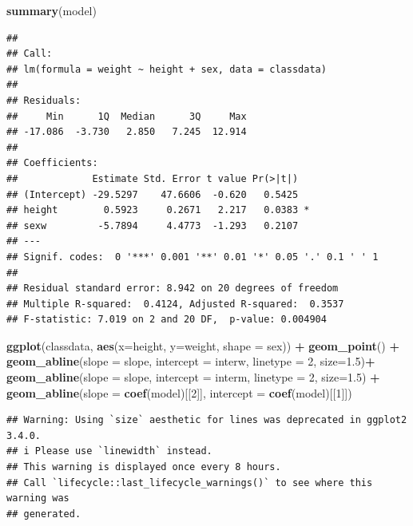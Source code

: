 \documentclass[
  doc]{apa6}
\newenvironment{Shaded}{\begin{snugshade}}{\end{snugshade}}
\newcommand{\AttributeTok}[1]{\textcolor[rgb]{0.13,0.29,0.53}{#1}}
\newcommand{\DecValTok}[1]{\textcolor[rgb]{0.00,0.00,0.81}{#1}}
\newcommand{\FloatTok}[1]{\textcolor[rgb]{0.00,0.00,0.81}{#1}}
\newcommand{\FunctionTok}[1]{\textcolor[rgb]{0.13,0.29,0.53}{\textbf{#1}}}
\newcommand{\NormalTok}[1]{#1}
\newcommand{\SpecialCharTok}[1]{\textcolor[rgb]{0.81,0.36,0.00}{\textbf{#1}}}
\begin{document}
\begin{Shaded}
\begin{Highlighting}[]
\FunctionTok{summary}\NormalTok{(model)}
\end{Highlighting}
\end{Shaded}

\begin{verbatim}
## 
## Call:
## lm(formula = weight ~ height + sex, data = classdata)
## 
## Residuals:
##     Min      1Q  Median      3Q     Max 
## -17.086  -3.730   2.850   7.245  12.914 
## 
## Coefficients:
##             Estimate Std. Error t value Pr(>|t|)  
## (Intercept) -29.5297    47.6606  -0.620   0.5425  
## height        0.5923     0.2671   2.217   0.0383 *
## sexw         -5.7894     4.4773  -1.293   0.2107  
## ---
## Signif. codes:  0 '***' 0.001 '**' 0.01 '*' 0.05 '.' 0.1 ' ' 1
## 
## Residual standard error: 8.942 on 20 degrees of freedom
## Multiple R-squared:  0.4124, Adjusted R-squared:  0.3537 
## F-statistic: 7.019 on 2 and 20 DF,  p-value: 0.004904
\end{verbatim}

\newpage

\begin{Shaded}
\begin{Highlighting}[]
\FunctionTok{ggplot}\NormalTok{(classdata, }\FunctionTok{aes}\NormalTok{(}\AttributeTok{x=}\NormalTok{height, }\AttributeTok{y=}\NormalTok{weight, }\AttributeTok{shape =}\NormalTok{ sex)) }\SpecialCharTok{+}
  \FunctionTok{geom\_point}\NormalTok{() }\SpecialCharTok{+}
  \FunctionTok{geom\_abline}\NormalTok{(}\AttributeTok{slope =}\NormalTok{ slope, }\AttributeTok{intercept =}\NormalTok{ interw, }\AttributeTok{linetype =} \DecValTok{2}\NormalTok{, }\AttributeTok{size=}\FloatTok{1.5}\NormalTok{)}\SpecialCharTok{+}
  \FunctionTok{geom\_abline}\NormalTok{(}\AttributeTok{slope =}\NormalTok{ slope, }\AttributeTok{intercept =}\NormalTok{ interm, }\AttributeTok{linetype =} \DecValTok{2}\NormalTok{, }\AttributeTok{size=}\FloatTok{1.5}\NormalTok{) }\SpecialCharTok{+}
  \FunctionTok{geom\_abline}\NormalTok{(}\AttributeTok{slope =} \FunctionTok{coef}\NormalTok{(model)[[}\DecValTok{2}\NormalTok{]], }\AttributeTok{intercept =} \FunctionTok{coef}\NormalTok{(model)[[}\DecValTok{1}\NormalTok{]]) }
\end{Highlighting}
\end{Shaded}

\begin{verbatim}
## Warning: Using `size` aesthetic for lines was deprecated in ggplot2 3.4.0.
## i Please use `linewidth` instead.
## This warning is displayed once every 8 hours.
## Call `lifecycle::last_lifecycle_warnings()` to see where this warning was
## generated.
\end{verbatim}
\end{document}
